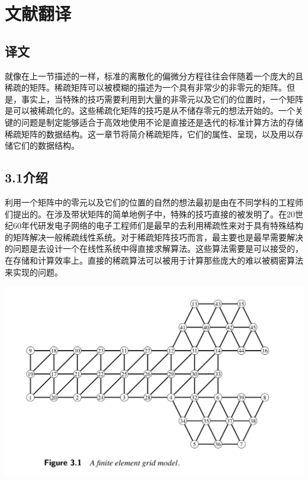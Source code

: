 \documentclass{article}
\begin{document}
 \newpage
\section{文献翻译}


\subsection{译文}
\qquad
\newline


就像在上一节描述的一样，标准的离散化的偏微分方程往往会伴随着一个庞大的且稀疏的矩阵。稀疏矩阵可以被模糊的描述为一个具有非常少的非零元的矩阵。但是，事实上，当特殊的技巧需要利用到大量的非零元以及它们的位置时，一个矩阵是可以被稀疏化的。这些稀疏化矩阵的技巧是从不储存零元的想法开始的。一个关键的问题是制定能够适合于高效地使用不论是直接还是迭代的标准计算方法的存储稀疏矩阵的数据结构。这一章节将简介稀疏矩阵，它们的属性、呈现，以及用以存储它们的数据结构。
\newline\newline

\subsection*{3.1介绍}

利用一个矩阵中的零元以及它们的位置的自然的想法最初是由在不同学科的工程师们提出的。在涉及带状矩阵的简单地例子中，特殊的技巧直接的被发明了。在20世纪60年代研发电子网络的电子工程师们是最早的去利用稀疏性来对于具有特殊结构的矩阵解决一般稀疏线性系统。对于稀疏矩阵技巧而言，最主要也是最早需要解决的问题是去设计一个在线性系统中得直接求解算法。这些算法需要是可以接受的，在存储和计算效率上。直接的稀疏算法可以被用于计算那些庞大的难以被稠密算法来实现的问题。
\newline\newline\newline\newline\newline\newline\newline\newline

\includegraphics[scale=0.25]{3_1.png}
\end{document}
